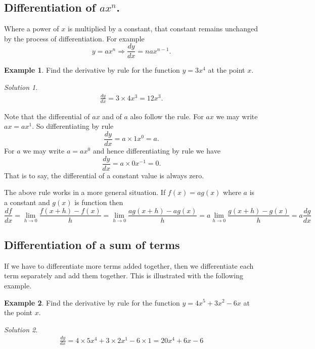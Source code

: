 \documentclass[
  11pt,
  oneside]{book}
\newcommand{\slide}{}
\theoremstyle{definition}
\theoremstyle{definition}
\newtheorem{example}{Example}[chapter]
\theoremstyle{definition}
\theoremstyle{definition}
\theoremstyle{remark}
\newtheorem*{solution}{Solution}
\begin{document}
\subsection{\texorpdfstring{Differentiation of \(ax^n\).}{Differentiation of ax\^{}n.}}\label{differentiation-of-axn.}

Where a power of \(x\) is multiplied by a constant, that constant remains unchanged by the process of differentiation. For example
\[
y = ax^n \Rightarrow \frac{dy}{dx} = nax^{n-1}.
\]

\begin{example}
Find the derivative by rule for the function \(y = 3x^4\) at the point \(x\).
\end{example}

\begin{solution}
\begin{gather*}
\frac{dy}{dx} = 3\times4x^3 = 12 x^3.
\end{gather*}
\end{solution}

Note that the differential of \(ax\) and of \(a\) also follow the rule. For \(ax\) we may write \(ax = ax^1\). So differentiating by rule
\[
\frac{dy}{dx} = a\times1x^0 = a.
\]
For \(a\) we may write \(a = ax^0\) and hence differentiating by rule we have
\[
\frac{dy}{dx} = a\times0x^{-1} = 0.
\]
That is to say, the differential of a constant value is always zero.

The above rule works in a more general situation. If \(f(x) = ag(x)\) where \(a\) is a constant and \(g(x)\) is function then
\[
\frac{df}{dx} = \lim\limits_{h\to0}\frac{f(x+h)-f(x)}{h} = \lim\limits_{h\to0}\frac{ag(x+h)-ag(x)}{h} = a\lim\limits_{h\to0}\frac{g(x+h)-g(x)}{h} = a\frac{dg}{dx}
\]
\slide

\subsection{Differentiation of a sum of terms}\label{differentiation-of-a-sum-of-terms}

If we have to differentiate more terms added together, then we differentiate each term separately and add them together. This is illustrated with the following example.

\begin{example}
Find the derivative by rule for the function \(y = 4x^5+3x^2-6x\) at the point \(x\).
\end{example}

\begin{solution}
\begin{gather*}
\frac{dy}{dx} = 4\times5x^4 + 3\times 2x^1 - 6\times1 = 20x^4+6x-6
\end{gather*}
\end{solution}
\end{document}
